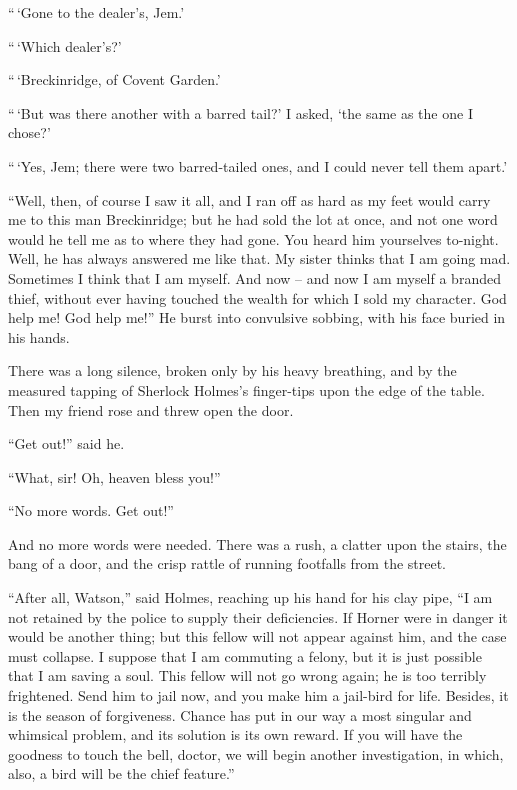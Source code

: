 “\,‘Gone to the dealer’s, Jem.’

“\,‘Which dealer’s?’

“\,‘Breckinridge, of Covent Garden.’

“\,‘But was there another with a barred tail?’ I asked, ‘the
same as the one I chose?’

“\,‘Yes, Jem; there were two barred-tailed ones, and I could
never tell them apart.’

“Well, then, of course I saw it all, and I ran off as hard as
my feet would carry me to this man Breckinridge; but he had
sold the lot at once, and not one word would he tell me as to
where they had gone. You heard him yourselves to-night.
Well, he has always answered me like that. My sister thinks
that I am going mad. Sometimes I think that I am myself.
And now -- and now I am myself a branded thief, without ever
having touched the wealth for which I sold my character.
God help me! God help me!” He burst into convulsive
sobbing, with his face buried in his hands.

There was a long silence, broken only by his heavy breathing,
and by the measured tapping of Sherlock Holmes’s finger-tips
upon the edge of the table. Then my friend rose and
threw open the door.

“Get out!” said he.

“What, sir! Oh, heaven bless you!”

“No more words. Get out!”

And no more words were needed. There was a rush, a
clatter upon the stairs, the bang of a door, and the crisp rattle
of running footfalls from the street.

“After all, Watson,” said Holmes, reaching up his hand
for his clay pipe, “I am not retained by the police to supply
their deficiencies. If Horner were in danger it would be another
thing; but this fellow will not appear against him, and
the case must collapse. I suppose that I am commuting a
felony, but it is just possible that I am saving a soul. This
fellow will not go wrong again; he is too terribly frightened.
Send him to jail now, and you make him a jail-bird for life.
Besides, it is the season of forgiveness. Chance has put in
our way a most singular and whimsical problem, and its solution
is its own reward. If you will have the goodness to
touch the bell, doctor, we will begin another investigation, in
which, also, a bird will be the chief feature.”


